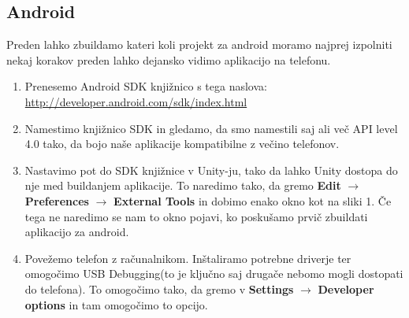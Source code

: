 {\color{indiagreen}\subsection{Android}}
Preden lahko zbuildamo kateri koli projekt za android moramo najprej izpolniti nekaj korakov preden lahko dejansko vidimo aplikacijo na telefonu.
\begin{enumerate}
	\item Prenesemo Android SDK knjižnico s tega naslova: \url{http://developer.android.com/sdk/index.html}
	\item Namestimo knjižnico SDK in gledamo, da smo namestili saj ali več API level 4.0 tako, da bojo naše aplikacije kompatibilne z večino telefonov.
	\item Nastavimo pot do SDK knjižnice v Unity-ju, tako da lahko Unity dostopa do nje med buildanjem aplikacije. To naredimo tako, da gremo \textbf{Edit}  $\rightarrow$ \textbf{Preferences} $\rightarrow$ \textbf{External Tools} in dobimo enako okno kot na sliki 1. Če tega ne naredimo se nam to okno pojavi, ko poskušamo prvič zbuildati aplikacijo za android.
	\item Povežemo telefon z računalnikom. Inštaliramo potrebne driverje ter omogočimo USB Debugging(to je ključno saj drugače nebomo mogli dostopati do telefona). To omogočimo tako, da gremo v \textbf{Settings}  $\rightarrow$ \textbf{Developer options} in tam omogočimo to opcijo.
\end{enumerate}